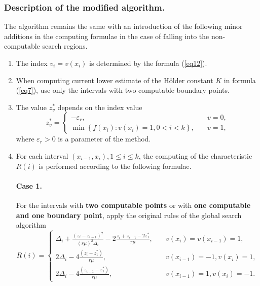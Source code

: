 \documentclass[runningheads]{llncs}
\begin{document}
\subsubsection{Description of the modified algorithm.} The algorithm remains the same with an introduction of the following minor additions in the computing formulae in the case of falling into the non-computable search regions.
\begin{enumerate} 
  \item The index $v_i=v(x_i)$ is determined by the formula (\ref{eq12}).
  \item When computing current lower estimate of the H{\"o}lder constant $K$ in formula (\ref{eq7}), use only the intervals with two computable boundary points.
  \item The value $z_v^*$ depends on the index value
\begin{equation}\label{eq20} 
z_v^*=
  \begin{cases}
    -\varepsilon _r, & {\quad v=0 ,}\\
    \min \left\{ f(x_i): v(x_i)=1, 0 < i < k \right\}, & {\quad v=1 ,}
  \end{cases}
\end{equation}
where $\varepsilon _r > 0$ is a parameter of the method.

  \item For each interval $(x_{i-1}, x_i), 1 \leq i \leq k$, the computing of the characteristic $R(i)$ is performed according to the following formulae.
      
        \paragraph{Case 1.} For the intervals with \textbf{two computable points} or with \textbf{one computable and one boundary point}, apply the original rules of the global search algorithm
\begin{equation}\label{eq21} 
R(i)=
  \begin{cases}
     \Delta _i+\frac {{(z_i-z_{i-1})}^2}{{(r \mu)}^2 \Delta _i} - 2 \frac {z_i+z_{i-1}-2z_1^*}{r \mu}, & {\quad  v(x_i)=v(x_{i-1})=1,}\\
    2 \Delta _i-4 \frac {(z_i-z_1^*)}{r \mu}, & {\quad  v(x_{i-1})=-1, v(x_i)=1,}\\
    2 \Delta _i-4 \frac {(z_{i-1}-z_1^*)}{r \mu}, & {\quad  v(x_{i-1})=1, v(x_i)=-1.}
  \end{cases}
\end{equation}

\end{enumerate}
\end{document}
